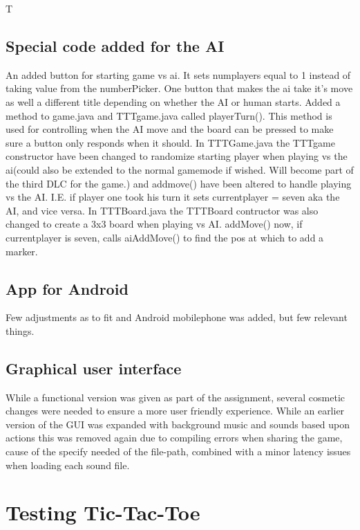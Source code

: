 \documentclass[a4paper,10pt]{article}
\begin{document}
T

\subsection{Special code added for the AI}
An added button for starting game vs ai. It sets numplayers equal to 1 instead of taking value from the numberPicker.
One button that makes the ai take it's move as well a different title depending on whether the AI or human starts.
Added a method to game.java and TTTgame.java called playerTurn(). This method is used for controlling when the AI move and the board can be pressed to make sure a button only responds when it should.
In TTTGame.java the TTTgame constructor have been changed to randomize starting player when playing vs the ai(could also be extended to the normal gamemode if wished. Will become part of the third DLC for the game.) and addmove() have been altered to handle playing vs the AI. I.E. if player one took his turn it sets currentplayer = seven aka the AI, and vice versa.
In TTTBoard.java the TTTBoard contructor was also changed to create a 3x3 board when playing vs AI. addMove() now, if currentplayer is seven, calls aiAddMove() to find the pos at which to add a marker.


\subsection{App for Android}
Few adjustments as to fit and Android mobilephone was added, but few relevant things.
\subsection{Graphical user interface}
While a functional version was given as part of the assignment, several cosmetic changes were needed to ensure a more user friendly experience. While an earlier version of the GUI was expanded with background music and sounds based upon actions this was removed again due to compiling errors when sharing the game, cause of the specify needed of the file-path, combined with a minor latency issues when loading each sound file.
	
	\section{Testing Tic-Tac-Toe}
	
\end{document}

